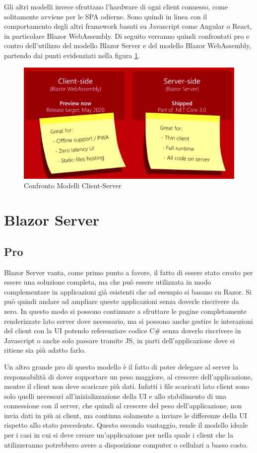 Gli altri modelli invece sfruttano l'hardware di ogni client connesso, come solitamente avviene per le SPA odierne.
Sono quindi in linea con il comportamento degli altri framework basati su Javascript come Angular o React, in particolare Blazor WebAssembly. 
Di seguito verranno quindi confrontati pro e contro dell'utilizzo del modello Blazor Server e del modello Blazor WebAssembly, partendo dai punti evidenziati nella figura \ref{fig:blazorModelsProCons}.
\begin{figure}[H]
	\centerline{\includegraphics[scale=0.8]{figure/ClientServerProCons.png}}
	\caption{Confronto Modelli Client-Server}
	\label{fig:blazorModelsProCons}
\end{figure}

\section{Blazor Server}\label{sez:scalabilitaBServer}
\subsection{Pro}\label{sez:proBServer}
Blazor Server vanta, come primo punto a favore, il fatto di essere stato creato per essere una soluzione completa, ma che pu\`o essere utilizzata in modo complementare in applicazioni gi\`a esistenti che ad esempio si basano su Razor.
Si pu\`o quindi andare ad ampliare queste applicazioni senza doverle riscrivere da zero.
In questo modo si possono continuare a sfruttare le pagine completamente renderizzate lato server dove necessario, ma si possono anche gestire le interazioni del client con la UI potendo referenziare codice C\# senza doverlo riscrivere in Javascript o anche solo passare tramite JS, in parti dell'applicazione dove si ritiene sia pi\`u adatto farlo.

Un altro grande pro di questo modello \`e il fatto di poter delegare al server la responsabilit\`a di dover sopportare un peso maggiore, al crescere dell'applicazione, mentre il client non deve scaricare pi\`u dati.
Infatti i file scaricati lato client sono solo quelli necessari all'inizializzazione della UI e allo stabilimento di una connessione con il server, che quindi al crescere del peso dell'applicazione, non invia dati in pi\`u ai client, ma continua solamente a inviare le differenze della UI rispetto allo stato precedente.
Questo secondo vantaggio, rende il modello ideale per i casi in cui si deve creare un'applicazione per nella quale i client che la utilizzeranno potrebbero avere a disposizione computer o cellulari a basso costo.

